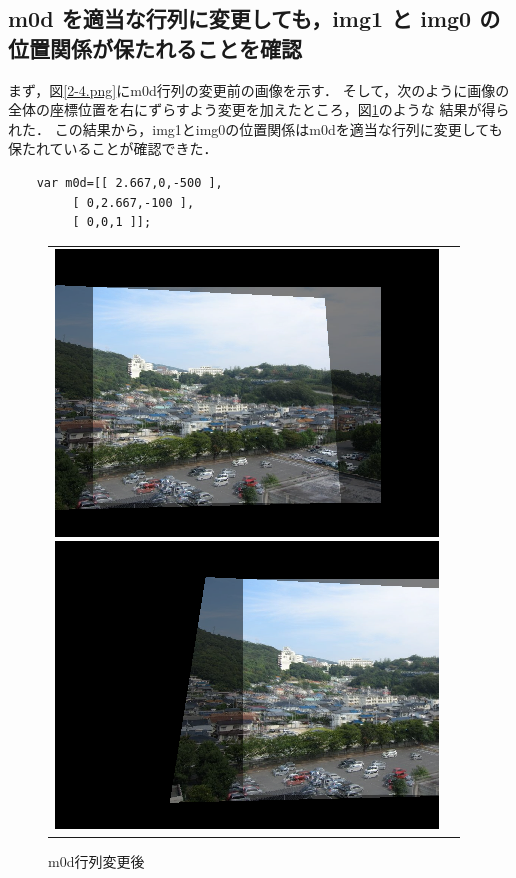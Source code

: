 \documentclass[11pt]{jarticle}
\begin{document}
\subsection{m0d を適当な行列に変更しても，img1 と img0 の位置関係が保たれることを確認}
まず，図\ref{2-4.png}にm0d行列の変更前の画像を示す．
そして，次のように画像の全体の座標位置を右にずらすよう変更を加えたところ，図\ref{2-5.png}のような
結果が得られた．
この結果から，img1とimg0の位置関係はm0dを適当な行列に変更しても保たれていることが確認できた．
\begin{verbatim}
    var m0d=[[ 2.667,0,-500 ],
         [ 0,2.667,-100 ],
         [ 0,0,1 ]];
\end{verbatim}
\begin{figure}[htbp]
    \begin{tabular}{cc}
        \begin{minipage}{0.5\hsize}
            \begin{center}
                \includegraphics[scale=.5]{2-4.png}
                \caption{m0d行列変更前}
                \label{2-4.png}
            \end{center}
        \end{minipage}
        \begin{minipage}{0.5\hsize}
            \begin{center}
                \includegraphics[scale=.5]{2-5.png}
                \caption{m0d行列変更後}
                \label{2-5.png}
            \end{center}
        \end{minipage}
    \end{tabular}
\end{figure}
\end{document}

